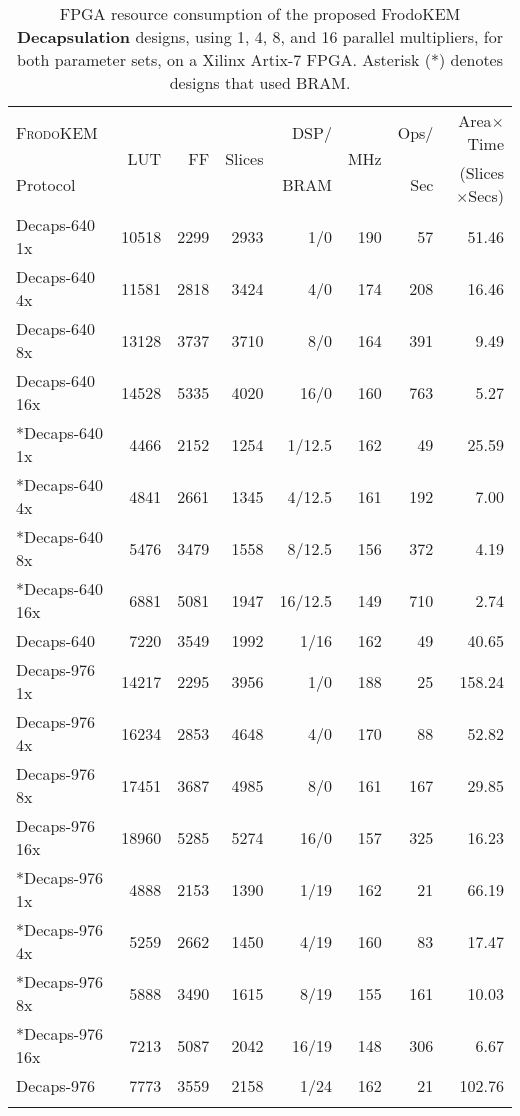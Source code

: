 \begin{table*}
\centering
\caption{FPGA resource consumption of the proposed FrodoKEM \textbf{Decapsulation} designs, using 1, 4, 8, and 16 parallel multipliers, for both parameter sets, on a Xilinx Artix-7 FPGA. Asterisk (*) denotes designs that used BRAM.}\label{tab:decapsresults}

\begin{tabular}{l r r r r r r r}
\hline \Tstrut
  \textsc{FrodoKEM} & \multirow{2}{*}{LUT} & \multirow{2}{*}{FF} & \multirow{2}{*}{Slices} & DSP/ & \multirow{2}{*}{MHz} & Ops/ & Area$\times$Time \\
Protocol &&&& BRAM && Sec & (Slices$\times$Secs) \\ \hline \Tstrut

Decaps-640 1x & 10518 & 2299 & 2933 & 1/0 & 190 & 57 & 51.46 \\
Decaps-640 4x & 11581 & 2818 & 3424 & 4/0 & 174 & 208 & 16.46 \\
Decaps-640 8x & 13128 & 3737 & 3710 & 8/0 & 164 & 391 & 9.49 \\
Decaps-640 16x & 14528 & 5335 & 4020 & 16/0 & 160 & 763 & 5.27 \\ \hline \Tstrut
*Decaps-640 1x & 4466 & 2152 & 1254 & 1/12.5 & 162 & 49 & 25.59 \\
*Decaps-640 4x & 4841 & 2661 & 1345 & 4/12.5 & 161 & 192 & 7.00 \\
*Decaps-640 8x & 5476 & 3479 & 1558 & 8/12.5 & 156 & 372 & 4.19 \\
*Decaps-640 16x & 6881 & 5081 & 1947 & 16/12.5 & 149 & 710 & 2.74 \\ \hline \Tstrut

Decaps-640 \cite{howe2018standard} & 7220 & 3549 & 1992 & 1/16 & 162 & 49 & 40.65 \\ \hline \Tstrut

Decaps-976 1x & 14217 & 2295 & 3956 & 1/0 & 188 & 25 & 158.24 \\
Decaps-976 4x & 16234 & 2853 & 4648 & 4/0 & 170 & 88 & 52.82 \\
Decaps-976 8x & 17451 & 3687 & 4985 & 8/0 & 161 & 167 & 29.85 \\
Decaps-976 16x & 18960 & 5285 & 5274 & 16/0 & 157 & 325  & 16.23 \\ \hline \Tstrut
*Decaps-976 1x & 4888 & 2153 & 1390 & 1/19 & 162 & 21 & 66.19 \\
*Decaps-976 4x & 5259 & 2662 & 1450 & 4/19 & 160 & 83 & 17.47 \\
*Decaps-976 8x & 5888 & 3490 & 1615 & 8/19 & 155 & 161 & 10.03 \\
*Decaps-976 16x & 7213 & 5087 & 2042 & 16/19 & 148 & 306 & 6.67 \\ \hline \Tstrut

Decaps-976 \cite{howe2018standard} & 7773 & 3559 & 2158 & 1/24 & 162 & 21 & 102.76 \\ \hline \Tstrut

\end{tabular}%
\end{table*}

